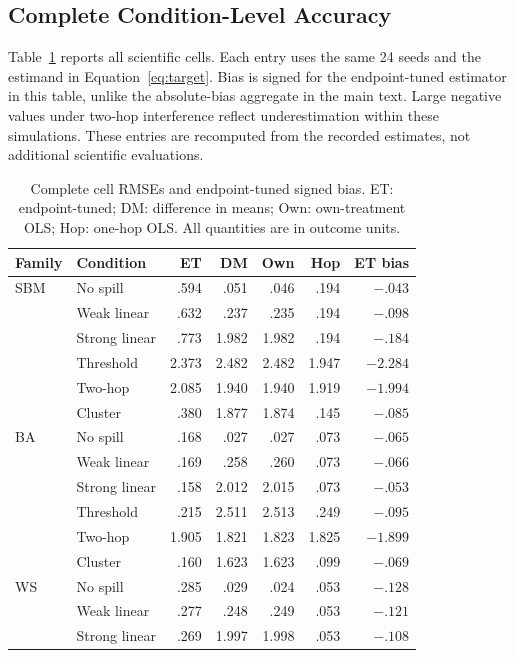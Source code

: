 \documentclass{article}
\begin{document}
\subsection{Complete Condition-Level Accuracy}
Table~\ref{tab:cells} reports all scientific cells. Each entry uses the same 24 seeds and the estimand in Equation~\ref{eq:target}. Bias is signed for the endpoint-tuned estimator in this table, unlike the absolute-bias aggregate in the main text. Large negative values under two-hop interference reflect underestimation within these simulations. These entries are recomputed from the recorded estimates, not additional scientific evaluations.
\begin{table}[h]
\centering\small
\caption{Complete cell RMSEs and endpoint-tuned signed bias. ET: endpoint-tuned; DM: difference in means; Own: own-treatment OLS; Hop: one-hop OLS. All quantities are in outcome units.}
\label{tab:cells}
\begin{tabular}{llrrrrr}
\toprule Family & Condition & ET & DM & Own & Hop & ET bias\\\midrule
SBM & No spill & .594 & .051 & .046 & .194 & $-.043$\\
 & Weak linear & .632 & .237 & .235 & .194 & $-.098$\\
 & Strong linear & .773 & 1.982 & 1.982 & .194 & $-.184$\\
 & Threshold & 2.373 & 2.482 & 2.482 & 1.947 & $-2.284$\\
 & Two-hop & 2.085 & 1.940 & 1.940 & 1.919 & $-1.994$\\
 & Cluster & .380 & 1.877 & 1.874 & .145 & $-.085$\\\midrule
BA & No spill & .168 & .027 & .027 & .073 & $-.065$\\
 & Weak linear & .169 & .258 & .260 & .073 & $-.066$\\
 & Strong linear & .158 & 2.012 & 2.015 & .073 & $-.053$\\
 & Threshold & .215 & 2.511 & 2.513 & .249 & $-.095$\\
 & Two-hop & 1.905 & 1.821 & 1.823 & 1.825 & $-1.899$\\
 & Cluster & .160 & 1.623 & 1.623 & .099 & $-.069$\\\midrule
WS & No spill & .285 & .029 & .024 & .053 & $-.128$\\
 & Weak linear & .277 & .248 & .249 & .053 & $-.121$\\
 & Strong linear & .269 & 1.997 & 1.998 & .053 & $-.108$\\

\end{tabular}
\end{table}
\end{document}
